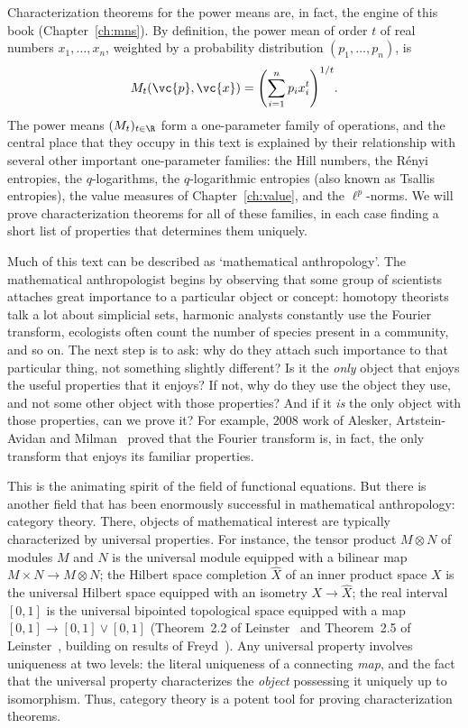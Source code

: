 Characterization theorems for the power%
%
%
means are, in fact, the engine of
this book (Chapter~\ref{ch:mns}).  By definition, the power mean of order
$t$ of real numbers $x_1, \ldots, x_n$, weighted by a probability
distribution $(p_1, \ldots, p_n)$, is
\[
M_t(\vc{p}, \vc{x}) 
=
\Biggl( \sum_{i = 1}^n p_i x_i^t \Biggr)^{1/t}.
\]
The power means $(M_t)_{t \in \R}$ form a one-parameter family of
operations, and the central place that they occupy in this text is explained
by their relationship with several other important one-parameter families:
the Hill numbers, the R\'enyi entropies, the $q$-logarithms, the
$q$-logarithmic entropies (also known as Tsallis entropies), the value
measures of Chapter~\ref{ch:value}, and the $\ell^p$-norms.  We will prove
characterization theorems for all of these families, in each case finding a
short list of properties that determines them uniquely.

\introbreak

Much of this text can be described as `mathematical%
% 
% 
anthropology'.  The mathematical anthropologist begins by observing that
some group of scientists attaches great importance to a particular object
or concept: homotopy theorists talk a lot about simplicial sets, harmonic
analysts constantly use the Fourier transform, ecologists often count the
number of species present in a community, and so on.  The next step is to
ask: why do they attach such importance to that particular thing, not
something slightly different?  Is it the \emph{only} object that enjoys the
useful properties that it enjoys?  If not, why do they use the object they
use, and not some other object with those properties?  And if it \emph{is}
the only object with those properties, can we prove it?  For
example, 2008 work of Alesker, Artstein-Avidan and Milman~\cite{AAAM}
proved that the Fourier transform is, in fact, the only transform that enjoys
its familiar properties.

This is the animating spirit of the field of functional equations.
But there is another field that has been
enormously successful in mathematical anthropology: category%
% 
theory.  There, objects of mathematical interest are typically
characterized by universal%
%
% 
properties.  For instance, the tensor product $M \otimes N$ of modules $M$
and $N$ is the universal module equipped with a bilinear map $M \times N
\to M \otimes N$; the Hilbert space completion $\hat{X}$ of an inner
product space $X$ is the universal Hilbert space equipped with an isometry
$X \to \hat{X}$; the real interval $[0, 1]$ is the universal bipointed
topological space equipped with a map $[0, 1] \to [0, 1] \vee [0, 1]$
(Theorem~2.2 of Leinster~\cite{GTSS} and Theorem~2.5 of
Leinster~\cite{GSSO}, building on results of Freyd~\cite{FreARA}).  Any
universal property involves uniqueness at two levels: the literal
uniqueness of a connecting \emph{map}, and the fact that the universal
property characterizes the \emph{object} possessing it uniquely up to
isomorphism.  Thus, category theory is a potent tool for proving
characterization theorems.

